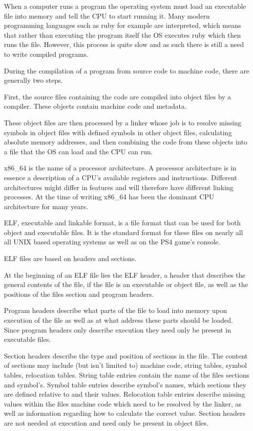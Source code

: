 \documentclass{article}
\begin{document}
When a computer runs a program the operating system must load an executable file into memory and tell the CPU to start running it. Many modern programming languages such as ruby for example are interpreted, which means that rather than executing the program itself the OS executes ruby which then runs the file.\cite{ExecutableWiki} However, this process is quite slow and as such there is still a need to write compiled programs.

During the compilation of a program from source code to machine code, there are generally two steps.\cite{LinkerWiki}

First, the source files containing the code are compiled into object files by a compiler. These objects contain machine code and metadata.\cite{LinkerWiki}

These object files are then processed by a linker whose job is to resolve missing symbols in object files with defined symbols in other object files, calculating absolute memory addresses, and then combining the code from these objects into a file that the OS can load and the CPU can run.\cite{LinkerWiki}

x86\_64 is the name of a processor architecture. A processor architecture is in essence a description of a CPU's available registers and instructions. Different architectures might differ in features and will therefore have different linking processes. At the time of writing x86\_64 has been the dominant CPU architecture for many years.\cite{X86Wiki}

ELF, executable and linkable format, is a file format that can be used for both object and executable files.\cite{ELFSpec} It is the standard format for these files on nearly all all UNIX based operating systems as well as on the PS4 game's console.\autocite{ELFWiki}

ELF files are based on headers and sections.\cite{ELFSpec}

At the beginning of an ELF file lies the ELF header, a header that describes the general contents of the file, if the file is an executable or object file, as well as the positions of the files section and program headers.\cite{ELFSpec}

Program headers describe what parts of the file to load into memory upon execution of the file as well as at what address these parts should be loaded. Since program headers only describe execution they need only be present in executable files.\cite{ELFSpec}

Section headers describe the type and position of sections in the file. The content of sections may include (but isn't limited to) machine code, string tables, symbol tables, relocation tables. String table entries contain the name of the files sections and symbol's. Symbol table entries describe symbol's names, which sections they are defined relative to and their values. Relocation table entries describe missing values within the files machine code which need to be resolved by the linker, as well as information regarding how to calculate the correct value. Section headers are not needed at execution and need only be present in object files.\cite{ELFSpec}
\end{document}
